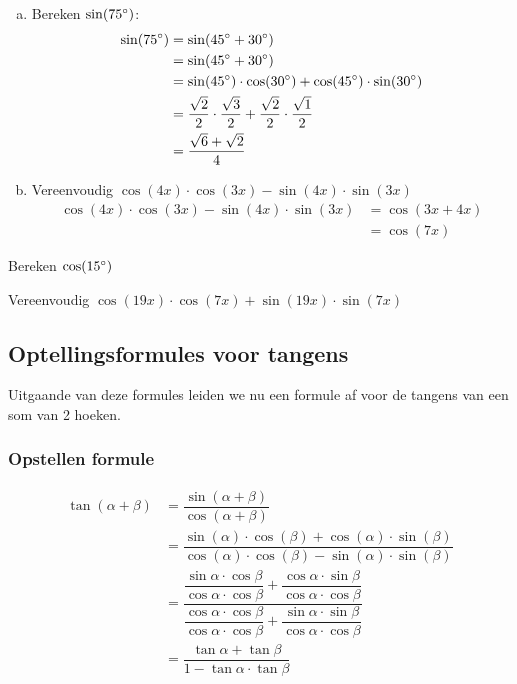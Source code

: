 \documentclass[a4paper,12pt]{article}
\begin{document}
  \begin{enumerate}[(a)]
    \item Bereken $\sin(75^\circ)$:
    \begin{align*}
      \sin(75^\circ)&=\sin(45^\circ+30^\circ)\\
                     &=\sin(45^\circ+30^\circ)\\
                     &=\sin(45^\circ)\cdot \cos(30^\circ)+\cos(45^\circ)\cdot \sin(30^\circ)\\
                     &=\frac{\sqrt{2}}{2}\cdot \frac{\sqrt{3}}{2}+\frac{\sqrt{2}}{2}\cdot\frac{\sqrt{1}}{2}\\
                     &=\frac{\sqrt{6}+\sqrt{2}}{4}
    \end{align*}
    \item Vereenvoudig $\cos(4x)\cdot \cos(3x)-\sin(4x)\cdot \sin(3x)$
    \begin{align*}
      \cos(4x)\cdot \cos(3x)-\sin(4x)\cdot \sin(3x)&=\cos(3x+4x)\\
                                                   &=\cos(7x)
    \end{align*}
  \end{enumerate}

\begin{oefening}
Bereken $\cos(15^\circ)$
\end{oefening}

\begin{oefening}
Vereenvoudig $\cos(19x)\cdot \cos(7x)+\sin(19x)\cdot \sin(7x)$
\end{oefening}

\pagebreak
\subsection{Optellingsformules voor tangens}
Uitgaande van deze formules leiden we nu een formule af voor de tangens van een som van 2 hoeken.

\subsubsection*{Opstellen formule}
\begin{align*}
  \tan(\alpha + \beta) &= \dfrac{\sin(\alpha + \beta)}{\cos(\alpha+\beta)}\\
                       &= \dfrac{\sin(\alpha)\cdot \cos(\beta)+\cos(\alpha)\cdot \sin(\beta)}{\cos(\alpha)\cdot \cos(\beta)-\sin(\alpha)\cdot \sin(\beta)}\\
                       &= \dfrac{\dfrac{\sin\alpha\cdot\cos\beta}{\cos\alpha\cdot\cos\beta}+\dfrac{\cos\alpha\cdot\sin\beta}{\cos\alpha\cdot\cos\beta}}{\dfrac{\cos\alpha\cdot\cos\beta}{\cos\alpha\cdot\cos\beta}+\dfrac{\sin\alpha\cdot\sin\beta}{\cos\alpha\cdot\cos\beta}}\\
                       &= \dfrac{\tan\alpha+\tan\beta}{1-\tan\alpha\cdot\tan\beta}
\end{align*}
\end{document}
